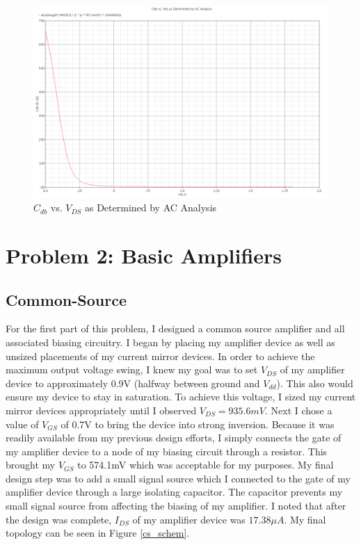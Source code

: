 \documentclass{article}
\begin{document}
\begin{figure}[H]
\centering
\includegraphics[width=5in]{1f.png}
\caption{$C_{db}$ vs. $V_{DS}$ as Determined by AC Analysis}
\label{1f}
\end{figure}
\newpage

\section{Problem 2: Basic Amplifiers}
\subsection{Common-Source}
For the first part of this problem, I designed a common source amplifier and all associated biasing circuitry. I began by placing my amplifier device as well as unsized placements of my current mirror devices. In order to achieve the maximum output voltage swing, I knew my goal was to set $V_{DS}$ of my amplifier device to approximately 0.9V (halfway between ground and $V_{dd}$). This also would ensure my device to stay in saturation. To achieve this voltage, I sized my current mirror devices appropriately until I observed $V_{DS} = 935.6mV$. Next I chose a value of $V_{GS}$ of 0.7V to bring the device into strong inversion. Because it was readily available from my previous design efforts, I simply connects the gate of my amplifier device to a node of my biasing circuit through a resistor. This brought my $V_{GS}$ to 574.1mV which was acceptable for my purposes. My final design step was to add a small signal source which I connected to the gate of my amplifier device through a large isolating capacitor. The capacitor prevents my small signal source from affecting the biasing of my amplifier. I noted that after the design was complete, $I_{DS}$ of my amplifier device was $17.38\mu A$. My final topology can be seen in Figure \ref{cs_schem}.
\end{document}
